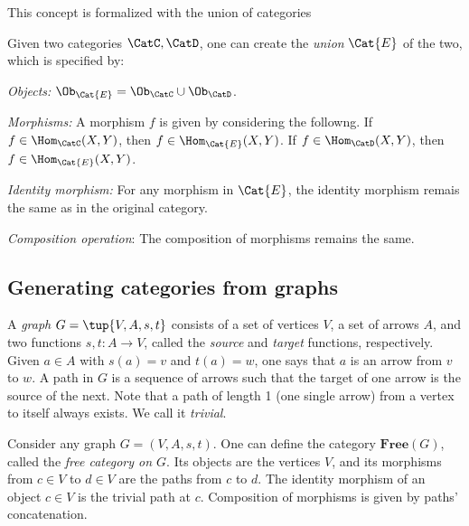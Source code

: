 This concept is formalized with the union of categories
\begin{definition}
Given two categories $\CatC,\CatD$, one can create the \emph{union} $\Cat{E}$ of the two, which is specified by:
\begin{compactenum}
\item \emph{Objects:} $\Ob_\Cat{E}=\Ob_\CatC \cup \Ob_\CatD$.
\item \emph{Morphisms:} A morphism $f$ is given by considering the followng. If $f\in \Hom_\CatC(X,Y)$, then $f\in \Hom_\Cat{E}(X,Y)$. If $f\in \Hom_\CatD(X,Y)$, then $f\in \Hom_\Cat{E}(X,Y)$.
\item \emph{Identity morphism:} For any morphism in $\Cat{E}$, the identity morphism remais the same as in the original category.
\item \emph{Composition operation}: The composition of morphisms remains the same.
\end{compactenum}
\end{definition}

\subsection{Generating categories from graphs}

\begin{definition}[Graph]
A \emph{graph} $G=\tup{V,A,s,t}$ consists of a set of vertices $V$, a set of arrows $A$, and two functions $s,t\colon A\to V$, called the \emph{source} and \emph{target} functions, respectively. Given $a\in A$ with $s(a)=v$ and $t(a)=w$, one says that $a$ is an arrow from $v$ to $w$. A path in $G$ is a sequence of arrows such that the target of one arrow is the source of the next. Note that a path of length 1 (one single arrow) from a vertex to itself always exists. We call it \emph{trivial}.
\end{definition}

\begin{shaded}
\begin{definition}
Consider any graph $G=(V,A,s,t)$. One can define the category $\mathbf{Free}(G)$, called the \emph{free category on $G$}. Its objects are the vertices $V$, and its morphisms from $c\in V$ to $d\in V$ are the paths from $c$ to $d$. The identity morphism of an object $c\in V$ is the trivial path at $c$. Composition of morphisms is given by paths' concatenation.
\end{definition}
\end{shaded}

